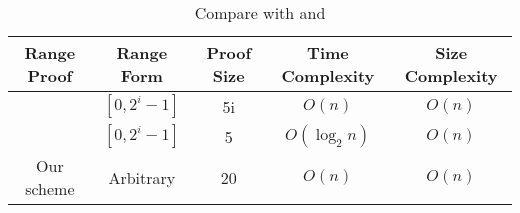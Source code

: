 \begin{table}[htbp]

\begin{center}%
\label{5-2}
\begin{adjustbox}{max width=1.1\textwidth}

\begin{tabular}[t]{|c|c|c|c|c|}
	\hline
	Range Proof& Range Form& Proof Size &Time Complexity& Size Complexity\\
	\hline
	\cite{li2017practical} &$[0,2^i-1]$& 5i& $O(n)$&$O(n)$\\
	\hline
	\cite{bunz2017bulletproofs} &$[0,2^i-1]$&5& $O(\log_2 n)$&$O(n)$\\
	\hline
	Our scheme&Arbitrary&20& $O(n)$& $O(n)$\\
	\hline
\end{tabular}

\end{adjustbox}
\end{center}
\caption{Compare with \cite{li2017practical} and \cite{bunz2017bulletproofs}}
\end{table}